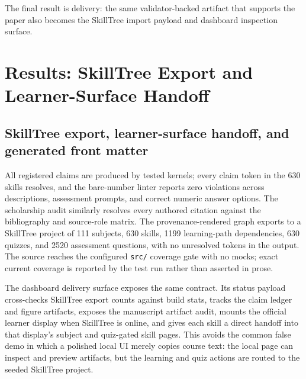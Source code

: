 \documentclass[
  english,
]{article}
\begin{document}
The final result is delivery: the same validator-backed artifact that
supports the paper also becomes the SkillTree import payload and
dashboard inspection surface.

\newpage

\section{Results: SkillTree Export and Learner-Surface
Handoff}\label{sec:results-skilltree-dashboard-front-matter}

\subsection{SkillTree export, learner-surface handoff, and generated
front
matter}\label{skilltree-export-learner-surface-handoff-and-generated-front-matter}

All registered claims are produced by tested kernels; every claim token
in the 630 skills resolves, and the bare-number linter reports zero
violations across descriptions, assessment prompts, and correct numeric
answer options. The scholarship audit similarly resolves every authored
citation against the bibliography and source-role matrix. The
provenance-rendered graph exports to a SkillTree project of 111
subjects, 630 skills, 1199 learning-path dependencies, 630 quizzes, and
2520 assessment questions, with no unresolved tokens in the output. The
source reaches the configured \texttt{src/} coverage gate with no mocks;
exact current coverage is reported by the test run rather than asserted
in prose.

The dashboard delivery surface exposes the same contract. Its status
payload cross-checks SkillTree export counts against build stats, tracks
the claim ledger and figure artifacts, exposes the manuscript artifact
audit, mounts the official learner display when SkillTree is online, and
gives each skill a direct handoff into that display's subject and
quiz-gated skill pages. This avoids the common false demo in which a
polished local UI merely copies course text: the local page can inspect
and preview artifacts, but the learning and quiz actions are routed to
the seeded SkillTree project.
\end{document}
